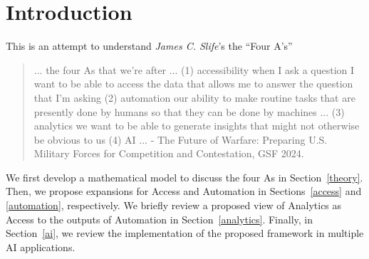 \section{Introduction}\label{intro}

This is an attempt to understand \emph{James C. Slife}'s the ``Four A's''~\cite{Slife24}
%
\begin{quote}
... the four As that we're after ... (1) accessibility when I ask a question I want to be able to access the data that allows me to answer the question that I'm asking (2) automation our ability to make routine tasks that are presently done by humans so that they can be done by machines ... (3) analytics we want to be able to generate insights that might not otherwise be obvious to us (4) AI ... - The Future of Warfare: Preparing U.S. Military Forces for Competition and Contestation, GSF 2024.
\end{quote}
%
We first develop a mathematical model to discuss the four As in Section~\ref{theory}. Then, we propose expansions for Access and Automation in Sections~\ref{access} and \ref{automation}, respectively. We briefly review a proposed view of Analytics as Access to the outputs of Automation in Section~\ref{analytics}. Finally, in Section~\ref{ai}, we review the implementation of the proposed framework in multiple AI applications.

